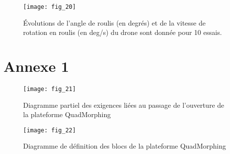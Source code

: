 \begin{figure}[H]
\centering
\texttt{[image: fig\_20]}
\caption{\label{fig_ccinppsi2022:20} ­Évolutions de l’angle de roulis (en degrés) et de la vitesse de rotation en roulis
(en \si{deg/s}) du drone sont donnée pour 10 essais.}
\end{figure}

\ifprof
\begin{corrige}
\end{corrige}
\else
\fi


\newpage

\section*{Annexe 1}


\begin{figure}[H]
\centering
\texttt{[image: fig\_21]}
\caption{\label{fig_ccinppsi2022:21} Diagramme partiel des exigences liées au passage de l’ouverture de la plateforme QuadMorphing}
\end{figure}

\begin{figure}[H]
\centering
\texttt{[image: fig\_22]}
\caption{\label{fig_ccinppsi2022:22} Diagramme de définition des blocs de la plateforme QuadMorphing}
\end{figure}
